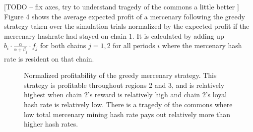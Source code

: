 \documentclass[10pt, preprint]{aastex}
\begin{document}
[TODO -- fix axes, try to understand tragedy of the commons a little better ]
Figure 4 shows the average expected profit of a mercenary following the greedy strategy taken over the simulation trials normalized by the expected profit if the mercenary hashrate had stayed on chain 1.  It is calculated by adding up $b_i \cdot \frac{\alpha}{\alpha + \beta_j} \cdot f_j$ for both chains $j=1,2$ for all periods $i$ where the mercenary hash rate is resident on that chain.

\begin{figure}
	\centering
	\qquad
	\qquad
	\qquad
	\qquad
	\caption{Normalized profitability of the greedy mercenary strategy.  This strategy is profitable throughout regions 2 and 3, and is relatively highest when chain 2's reward is relatively high and chain 2's loyal hash rate is relatively low.  There is a tragedy of the commons where low total mercenary mining hash rate pays out relatively more than higher hash rates.}
\end{figure}
\end{document}
